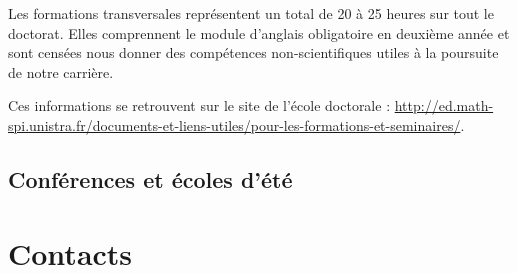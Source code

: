 \documentclass[a5paper]{article}
\begin{document}
\vspace{1em}

Les formations transversales représentent un total de 20 à 25 heures sur tout le doctorat. Elles comprennent le module d'anglais obligatoire en deuxième année et sont censées nous donner des compétences non-scientifiques utiles à la poursuite de notre carrière.

\vspace{2em}

Ces informations se retrouvent sur le site de l'école doctorale : \href{http://ed.math-spi.unistra.fr/documents-et-liens-utiles/pour-les-formations-et-seminaires/}{http://ed.math-spi.unistra.fr/documents-et-liens-utiles/pour-les-formations-et-seminaires/}.

\subsection{Conférences et écoles d'été}
\label{subsec:conf-ecoledete}

\appendix

\section{Contacts}
\label{sec:contacts}
\end{document}

